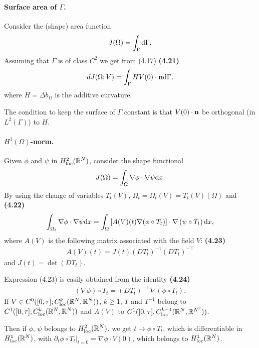 \documentclass[oneside]{book}
\numberwithin{equation}{section}
\begin{document}
\paragraph{Surface area of $\Gamma$.} Consider the (shape) area function
\begin{align*}
    J(\Omega) = \int_\Gamma {\rm d}\Gamma.
\end{align*}
Assuming that $\Gamma$ is of class $C^2$ we get from (4.17) \textbf{(4.21)}
\begin{align*}
    dJ(\Omega;V) = \int_\Gamma HV(0)\cdot{\bf n}{\rm d}\Gamma,
\end{align*}
where $H = \Delta b_\Omega$ is the additive curvature.

The condition to keep the surface of $\Gamma$ constant is that $V(0)\cdot{\bf n}$ be orthogonal (in $L^2(\Gamma)$) to $H$.

\paragraph{$H^1(\Omega)$-norm.} Given $\phi$ and $\psi$ in $H_{\rm loc}^2(\mathbb{R}^N)$, consider the shape functional
\begin{align*}
    J(\Omega) = \int_\Omega \nabla\phi\cdot\nabla\psi{\rm d}x.
\end{align*}
By using the change of variables $T_t(V)$, $\Omega_t = \Omega_t(V) = T_t(V)(\Omega)$ and \textbf{(4.22)}
\begin{align*}
    \int_{\Omega_t} \nabla\phi\cdot\nabla\psi{\rm d}x = \int_\Omega \left[A(V)(t)\nabla(\phi\circ T_t)\right]\cdot\nabla\left(\psi\circ T_t\right){\rm d}x,
\end{align*}
where $A(V)$ is the following matrix associated with the field $V$: \textbf{(4.23)}
\begin{align*}
    A(V)(t) = J(t)(DT_t)^{-1}(DT_t)^{-\top}
\end{align*}
and $J(t) = \det(DT_t)$.

Expression (4.23) is easily obtained from the identity \textbf{(4.24)}
\begin{align*}
    (\nabla\phi)\circ T_t = (DT_t)^{-\top}\nabla(\phi\circ T_t).
\end{align*}
If $V\in C^0([0,\tau];C_{\rm loc}^k(\mathbb{R}^N,\mathbb{R}^N))$, $k\ge 1$, $T$ and $T^{-1}$ belong to $C^1([0,\tau];C_{\rm loc}^k(\mathbb{R}^N,\mathbb{R}^N))$ and $A(V)$ to $C^1([0,\tau],C_{\rm loc}^{k-1}(\mathbb{R}^N,\mathbb{R}^{N^2}))$.

Then if $\phi$, $\psi$ belongs to $H_{\rm loc}^2(\mathbb{R}^N)$, we get $t\mapsto\phi\circ T_t$, which is differentiable in $H_{\rm loc}^1(\mathbb{R}^N)$, with $\partial_t\phi\circ T_t|_{t = 0} = \nabla\phi\cdot V(0)$, which belongs to $H_{\rm loc}^1(\mathbb{R}^N)$.
\end{document}
